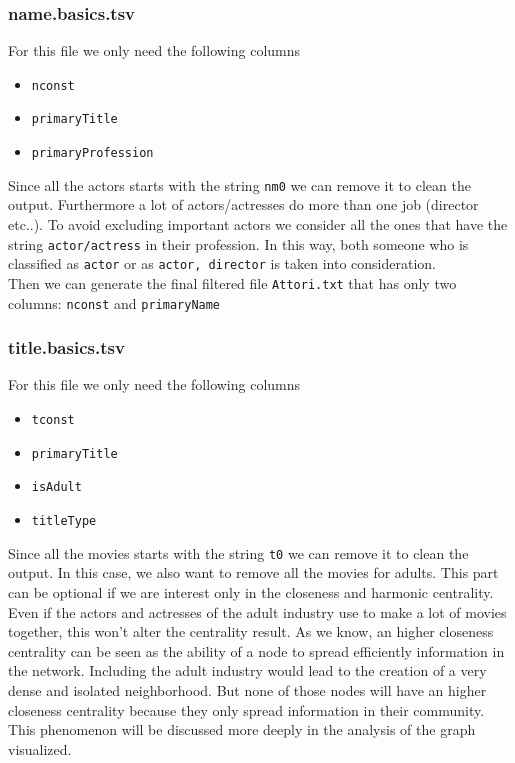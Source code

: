 \subsubsection{name.basics.tsv}

For this file we only need the following columns

\begin{itemize}
    \item \texttt{nconst}
    \item \texttt{primaryTitle}
    \item \texttt{primaryProfession}
\end{itemize}
Since all the actors starts with the string \texttt{nm0} we can remove it to clean the output. Furthermore a lot of actors/actresses do more than one job (director etc..). To avoid excluding important actors we consider all the ones that have the string \texttt{actor/actress} in their profession. In this way, both someone who is classified as \texttt{actor} or as \texttt{actor, director} is taken into consideration. \\

\noindent Then we can generate the final filtered file \texttt{Attori.txt} that has only two columns: \texttt{nconst} and \texttt{primaryName}


\subsubsection{title.basics.tsv}

For this file we only need the following columns

\begin{itemize}
    \item \texttt{tconst}
    \item \texttt{primaryTitle}
    \item \texttt{isAdult}
    \item \texttt{titleType}
\end{itemize}
Since all the movies starts with the string \texttt{t0} we can remove it to clean the output. In this case, we also want to remove all the movies for adults. This part can be optional if we are interest only in the closeness and harmonic centrality. Even if the actors and actresses of the adult industry use to make a lot of movies together, this won't alter the centrality result. As we know, an higher closeness centrality can be seen as the ability of a node to spread efficiently information in the network. Including the adult industry would lead to the creation of a very dense and isolated neighborhood. But none of those nodes will have an higher closeness centrality because they only spread information in their community. This phenomenon will be discussed more deeply in the analysis of the graph visualized. \\

